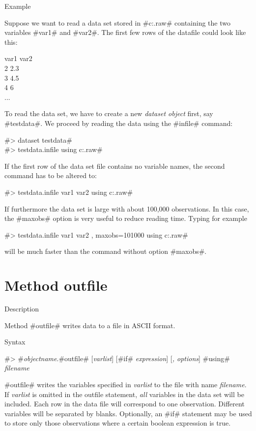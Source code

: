\begin{stanza}{Example}

Suppose we want to read a data set stored in
#c:\data\testdata.raw# containing the two variables #var1# and
#var2#. The first few rows of the datafile could look like this:

var1 var2 \\
2 2.3 \\
3 4.5 \\
4 6 \\
...


To read the data set, we have to create a new {\em dataset object}
first, say #testdata#. We proceed by reading the data using the
#infile# command:

#> dataset testdata# \\
#> testdata.infile using c:\data\testdata.raw#

If the first row of the data set file contains no variable names,
the second command has to be altered to:

#> testdata.infile var1 var2 using c:\data\testdata.raw#

If furthermore the data set is large with about 100,000
observations. In this case, the #maxobs# option is very useful to
reduce reading time. Typing for example

#> testdata.infile var1 var2 , maxobs=101000 using c:\data\testdata.raw#

will be much faster than the command without option #maxobs#.
\end{stanza}

\clearpage



\section{Method outfile}
\label{outfile}   

\begin{stanza}{Description}

Method #outfile# writes data to a file in ASCII format.
\end{stanza}



\begin{stanza}{Syntax}

{#> #{\em objectname}.#outfile# [{\em varlist}] [#if# {\em expression}] [{\em , options}] #using# {\em filename}

#outfile# writes the variables specified in {\em varlist} to the
file with name {\em filename}. If {\em varlist} is omitted in the
outfile statement, {\em all} variables in the data set will be
included. Each row in the data file will correspond to one
observation. Different variables will be separated by blanks.
Optionally, an #if# statement may be used to store only those
observations where a certain boolean expression is true.}
\end{stanza}


